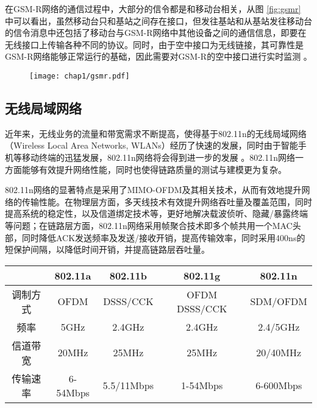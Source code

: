 在GSM-R网络的通信过程中，大部分的信令都是和移动台相关，从图 \ref{fig:gsmr} 中可以看出，虽然移动台只和基站之间存在接口，但发往基站和从基站发往移动台的信令消息中还包括了移动台与GSM-R网络中其他设备之间的通信信息，即要在无线接口上传输各种不同的协议。同时，由于空中接口为无线链接，其可靠性是GSM-R网络能够正常运行的基础，因此需要对GSM-R的空中接口进行实时监测 \cite{baldini2010early}。

\begin{figure}[!htp]
\centering
\texttt{[image: chap1/gsmr.pdf]}
\end{figure}

\subsection{无线局域网络}
\label{sec:80211n}

近年来，无线业务的流量和带宽需求不断提高，使得基于802.11n的无线局域网络（Wireless Local Area Networks, WLANs）经历了快速的发展，同时由于智能手机等移动终端的迅猛发展，802.11n网络将会得到进一步的发展 \cite{Bala2010wifi}。802.11n网络一方面能够有效提升网络性能，同时也使得链路质量的测试与建模更为复杂。

802.11n网络的显著特点是采用了MIMO-OFDM及其相关技术，从而有效地提升网络的传输性能。在物理层方面，多天线技术有效提升网络吞吐量及覆盖范围，同时提高系统的稳定性，以及信道绑定技术等，更好地解决载波侦听、隐藏/暴露终端等问题；在链路层方面，802.11n网络采用帧聚合技术即多个帧共用一个MAC头部，同时降低ACK发送频率及发送/接收开销，提高传输效率，同时采用400ns的短保护间隔，以降低时间开销，并提高链路层吞吐量。

\begin{table}[!htp]
\renewcommand{\arraystretch}{1}
\centering
\begin{threeparttable}[b]
\begin{tabular}{ccccc}
\hline
         & 802.11a  & 802.11b    & 802.11g       & 802.11n \\
\hline
调制方式 & OFDM     & DSSS/CCK   & OFDM DSSS/CCK & SDM/OFDM \\
频率     & 5GHz     & 2.4GHz     & 2.4GHz        & 2.4/5GHz \\
信道带宽 & 20MHz    & 25MHz      & 25MHz         & 20/40MHz \\
传输速率 & 6-54Mbps & 5.5/11Mbps & 1-54Mbps     & 6-600Mbps \\
\hline
\end{tabular}
\end{threeparttable}
\end{table}

